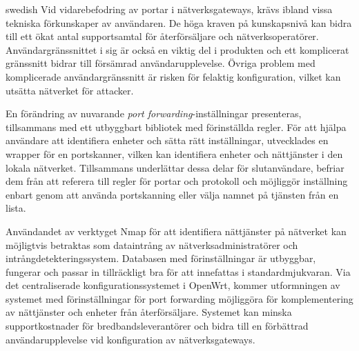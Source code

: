 \documentclass[a4paper,11pt,makeidx]{kth-bcs}
\newcommand\blankpage{%
    \null
    \thispagestyle{empty}%
    \addtocounter{page}{-1}%
    \newpage}
\begin{document}
\begin{foreignabstract}{swedish}
Vid vidarebefodring av portar i nätverksgateways, krävs ibland vissa tekniska förkunskaper av användaren.
De höga kraven på kunskapsnivå kan bidra till ett ökat antal supportsamtal för återförsäljare och nätverksoperatörer.
Användargränssnittet i sig är också en viktig del i produkten och ett komplicerat gränssnitt bidrar till försämrad användarupplevelse.
Övriga problem med komplicerade användargränssnitt är risken för felaktig konfiguration, vilket kan utsätta nätverket för attacker.

En förändring av nuvarande \emph{port forwarding}-inställningar presenteras, tillsammans med ett utbyggbart bibliotek med förinställda regler.
För att hjälpa användare att identifiera enheter och sätta rätt inställningar, utvecklades en wrapper för en portskanner, vilken kan identifiera enheter och nättjänster i den lokala nätverket.
Tillsammans underlättar dessa delar för slutanvändare, befriar dem från att referera till regler för portar och protokoll och möjliggör inställning enbart genom att använda portskanning eller välja namnet på tjänsten från en lista.

Användandet av verktyget Nmap för att identifiera nättjänster på nätverket kan möjligtvis betraktas som dataintrång av nätverksadministratörer och intrångdetekteringssystem.
Databasen med förinställningar är utbyggbar, fungerar och passar in tillräckligt bra för att innefattas i standardmjukvaran.
Via det centraliserade konfigurationssystemet i OpenWrt, kommer utformningen av systemet med förinställningar för port forwarding möjliggöra för komplementering av nättjänster och enheter från återförsäljare. 
Systemet kan minska supportkostnader för bredbandsleverantörer och bidra till en förbättrad användarupplevelse vid konfiguration av nätverksgateways.

\newpage
\blankpage

\end{foreignabstract}
\clearpage
\end{document}
